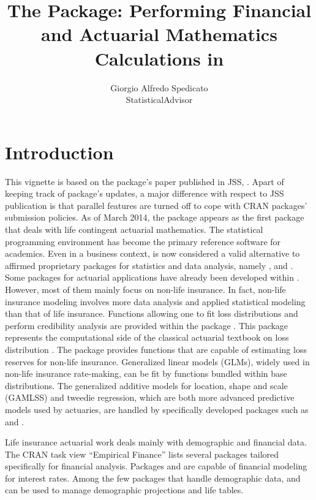 \documentclass[nojss]{jss}
\author{Giorgio Alfredo Spedicato\\StatisticalAdvisor}
\title{The \pkg{lifecontingencies} Package: Performing Financial and Actuarial Mathematics Calculations in \proglang{R}}
\begin{document}



\maketitle

\section{Introduction}
This vignette is based on the package's paper published in JSS,
\cite{spedLifecon}. Apart of keeping track of package's updates, a major
difference with respect to JSS publication is that parallel features are turned
off to cope with CRAN packages' submission policies. As of March 2014, the
 package
\citep{spedLifecon} appears as the first  package that deals with life contingent actuarial mathematics. The 
statistical programming environment \citep{rSoftware} has become the
primary reference software for academics. Even in a business context,
 is now considered a valid alternative to affirmed
proprietary packages for statistics and data analysis, namely
 \citep{SAS},  \citep{MATLAB} and
 \citep{SPSS}. Some packages for actuarial applications
have already been developed within . However, most of them
mainly focus on non-life insurance. In fact, non-life insurance
modeling involves more data analysis and applied statistical modeling
than that of life insurance. Functions allowing one to fit loss
distributions and perform credibility analysis are provided within the
package  \citep{Dutang2008}. This package represents the
computational side of the classical actuarial textbook on loss
distribution \citep{klugman2009loss}. The package 
\citep{chainLadder} provides functions that are capable of estimating
loss reserves for non-life insurance. Generalized linear models
(GLMs), widely used in non-life insurance rate-making, can be fit by
functions bundled within base  distributions. The
generalized additive models for location, shape and scale (GAMLSS) and
tweedie regression, which are both more advanced predictive models
used by actuaries, are handled by specifically developed packages such
as  \citep{gamlssPkg,gamlsspkg2} and  \citep{cplmPkg}.

Life insurance actuarial work deals mainly with demographic and
financial data.  The CRAN task view ``Empirical Finance''
\citep{taskview} lists several packages tailored specifically for
financial analysis. Packages  \citep{YieldCurveR} and
 \citep{termstrcR} are capable of financial modeling for
interest rates. Among the few packages that handle demographic data,
 \citep{demographyR} and 
\citep{LifeTableR} can be used to manage demographic projections and
life tables.
\end{document}
